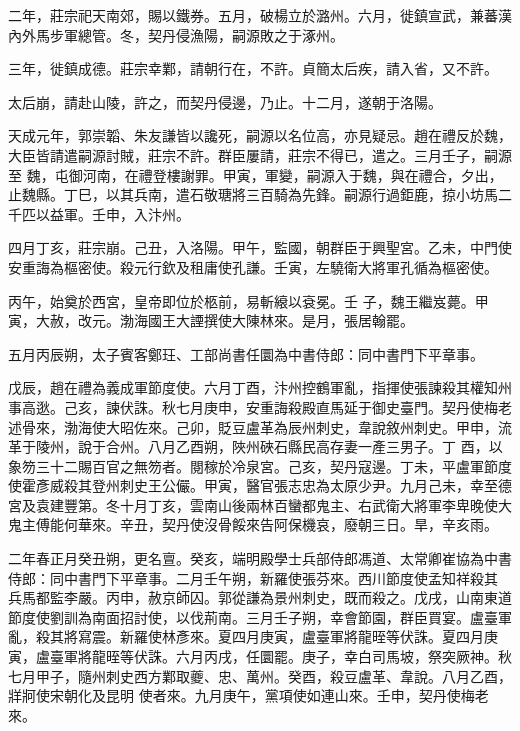 \begin{pinyinscope}
 二年，莊宗祀天南郊，賜以鐵券。五月，破楊立於潞州。六月，徙鎮宣武，兼蕃漢內外馬步軍總管。冬，契丹侵漁陽，嗣源敗之于涿州。



 三年，徙鎮成德。莊宗幸鄴，請朝行在，不許。貞簡太后疾，請入省，又不許。



 太后崩，請赴山陵，許之，而契丹侵邊，乃止。十二月，遂朝于洛陽。



 天成元年，郭崇韜、朱友謙皆以讒死，嗣源以名位高，亦見疑忌。趙在禮反於魏，大臣皆請遣嗣源討賊，莊宗不許。群臣屢請，莊宗不得已，遣之。三月壬子，嗣源至
 魏，屯御河南，在禮登樓謝罪。甲寅，軍變，嗣源入于魏，與在禮合，夕出，止魏縣。丁巳，以其兵南，遣石敬瑭將三百騎為先鋒。嗣源行過鉅鹿，掠小坊馬二千匹以益軍。壬申，入汴州。



 四月丁亥，莊宗崩。己丑，入洛陽。甲午，監國，朝群臣于興聖宮。乙未，中門使安重誨為樞密使。殺元行欽及租庸使孔謙。壬寅，左驍衛大將軍孔循為樞密使。



 丙午，始奠於西宮，皇帝即位於柩前，易斬縗以袞冕。壬
 子，魏王繼岌薨。甲寅，大赦，改元。渤海國王大諲撰使大陳林來。是月，張居翰罷。



 五月丙辰朔，太子賓客鄭玨、工部尚書任圜為中書侍郎：同中書門下平章事。



 戊辰，趙在禮為義成軍節度使。六月丁酉，汴州控鶴軍亂，指揮使張諫殺其權知州事高逖。己亥，諫伏誅。秋七月庚申，安重誨殺殿直馬延于御史臺門。契丹使梅老述骨來，渤海使大昭佐來。己卯，貶豆盧革為辰州刺史，韋說敘州刺史。甲申，流革于陵州，說于合州。八月乙酉朔，陜州硤石縣民高存妻一產三男子。丁
 酉，以象笏三十二賜百官之無笏者。閱稼於冷泉宮。己亥，契丹寇邊。丁未，平盧軍節度使霍彥威殺其登州刺史王公儼。甲寅，醫官張志忠為太原少尹。九月己未，幸至德宮及袁建豐第。冬十月丁亥，雲南山後兩林百蠻都鬼主、右武衛大將軍李卑晚使大鬼主傅能何華來。辛丑，契丹使沒骨餒來告阿保機哀，廢朝三日。旱，辛亥雨。



 二年春正月癸丑朔，更名亶。癸亥，端明殿學士兵部侍郎馮道、太常卿崔協為中書侍郎：同中書門下平章事。二月壬午朔，新羅使張芬來。西川節度使孟知祥殺其
 兵馬都監李嚴。丙申，赦京師囚。郭從謙為景州刺史，既而殺之。戊戌，山南東道節度使劉訓為南面招討使，以伐荊南。三月壬子朔，幸會節園，群臣買宴。盧臺軍亂，殺其將寫震。新羅使林彥來。夏四月庚寅，盧臺軍將龍晊等伏誅。夏四月庚寅，盧臺軍將龍晊等伏誅。六月丙戌，任圜罷。庚子，幸白司馬坡，祭突厥神。秋七月甲子，隨州刺史西方鄴取夔、忠、萬州。癸酉，殺豆盧革、韋說。八月乙酉，牂牁使宋朝化及昆明
 使者來。九月庚午，黨項使如連山來。壬申，契丹使梅老來。




\end{pinyinscope}
